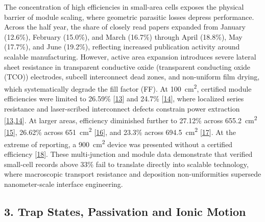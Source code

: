 \documentclass[
  11pt,
]{article}
\begin{document}
The concentration of high efficiencies in small-area cells exposes the
physical barrier of module scaling, where geometric parasitic losses
depress performance. Across the half year, the share of closely read
papers expanded from January (12.6\%), February (15.0\%), and March
(16.7\%) through April (18.8\%), May (17.7\%), and June (19.2\%),
reflecting increased publication activity around scalable manufacturing.
However, active area expansion introduces severe lateral sheet
resistance in transparent conductive oxide (transparent conducting oxide
(TCO)) electrodes, subcell interconnect dead zones, and non-uniform film
drying, which systematically degrade the fill factor (FF). At
\qty{100}{\centi\meter\squared}, certified module efficiencies were
limited to 26.59\%
{[}\href{https://doi.org/10.1126/sciadv.aec3238}{13}{]} and 24.7\%
{[}\href{https://doi.org/10.1038/s41467-026-69685-6}{14}{]}, where
localized series resistance and laser-scribed interconnect defects
constrain power extraction
{[}\href{https://doi.org/10.1126/sciadv.aec3238}{13},\href{https://doi.org/10.1038/s41467-026-69685-6}{14}{]}.
At larger areas, efficiency diminished further to 27.12\% across
\qty{655.2}{\centi\meter\squared}
{[}\href{https://doi.org/10.1002/adma.73855}{15}{]}, 26.62\% across
\qty{651}{\centi\meter\squared}
{[}\href{https://doi.org/10.1002/aenm.71111}{16}{]}, and 23.3\% across
\qty{694.5}{\centi\meter\squared}
{[}\href{https://doi.org/10.1002/solr.70353}{17}{]}. At the extreme of
reporting, a \qty{900}{\centi\meter\squared} device was presented
without a certified efficiency
{[}\href{https://doi.org/10.1002/adfm.202532205}{18}{]}. These
multi-junction and module data demonstrate that verified small-cell
records above 33\% fail to translate directly into scalable technology,
where macroscopic transport resistance and deposition non-uniformities
supersede nanometer-scale interface engineering.

\subsection{3. Trap States, Passivation and Ionic
Motion}\label{trap-states-passivation-and-ionic-motion}
\end{document}

